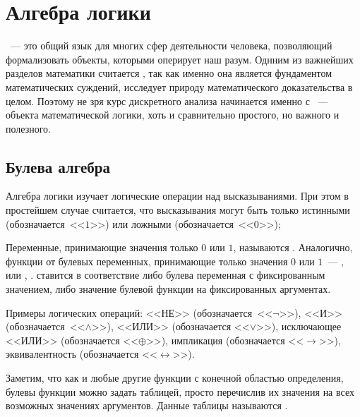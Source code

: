 \section{Алгебра логики} \label{sec:boolean}

~--- это общий язык для многих сфер деятельности человека, позволяющий формализовать объекты, которыми оперирует наш разум.
Однним из важнейших разделов математики считается ,
так как именно она является фундаментом математических суждений, исследует природу математического доказательства в целом.
Поэтому не зря курс дискретного анализа начинается именно с ~---
объекта математической логики, хоть и сравнительно простого, но важного и полезного.



\subsection{Булева алгебра}
\label{subsec:boolean:algebra}


Алгебра логики изучает логические операции над высказываниями.
При этом в простейшем случае считается, что высказывания могут быть только истинными (обозначается~<<$ 1 $>>) или ложными (обозначается~<<$ 0 $>>);

\begin{definition}
    Переменные, принимающие значения только $ 0 $ или $ 1 $, называются .
    Аналогично, функции от булевых переменных, принимающие только значения $ 0 $ или $ 1 $~--- , или , .
     ставится в соответствие либо булева переменная с фиксированным значением, либо значение булевой функции на фиксированных аргументах.
\end{definition}

Примеры логических операций:
<<НЕ>> (обозначается~<<$ \neg $>>),
<<И>> (обозначается~<<$ \wedge $>>),
<<ИЛИ>> (обозначается <<$ \vee $>>),
исключающее <<ИЛИ>> (обозначается <<$ \oplus $>>),
импликация (обозначается <<$ \rightarrow $>>),
эквивалентность (обозначается <<$ \leftrightarrow $>>).

Заметим, что как и любые другие функции с конечной областью определения, булевы функции можно задать таблицей, просто перечислив их значения на всех возможных значениях аргументов.
Данные таблицы называются .

